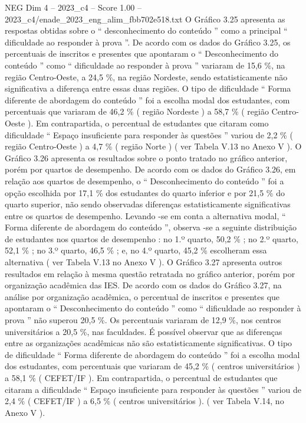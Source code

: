 \begin{textsample}{NEG Dim 4 – 2023\_c4 – Score 1.00 – 2023\_c4/enade\_2023\_eng\_alim\_fbb702e518.txt}
O Gráfico 3.25 apresenta as respostas obtidas sobre o “ desconhecimento do conteúdo ” como a principal “ dificuldade ao responder à prova ”.
De acordo com os dados do Gráfico 3.25, os percentuais de inscritos e presentes que apontaram o “ Desconhecimento do conteúdo ” como “ dificuldade ao responder à prova ” variaram de 15,6 \%, na região Centro-Oeste, a 24,5 \%, na região Nordeste, sendo estatisticamente não significativa a diferença entre essas duas regiões.
O tipo de dificuldade “ Forma diferente de abordagem do conteúdo ” foi a escolha modal dos estudantes, com percentuais que variaram de 46,2 \% ( região Nordeste ) a 58,7 \% ( região Centro-Oeste ).
Em contrapartida, o percentual de estudantes que citaram como dificuldade “ Espaço insuficiente para responder às questões ” variou de 2,2 \% ( região Centro-Oeste ) a 4,7 \% ( região Norte ) ( ver Tabela V.13 no Anexo V ).
O Gráfico 3.26 apresenta os resultados sobre o ponto tratado no gráfico anterior, porém por quartos de desempenho.
De acordo com os dados do Gráfico 3.26, em relação aos quartos de desempenho, o “ Desconhecimento do conteúdo ” foi a opção escolhida por 17,1 \% dos estudantes do quarto inferior e por 21,5 \% do quarto superior, não sendo observadas diferenças estatisticamente significativas entre os quartos de desempenho.
Levando -se em conta a alternativa modal, “ Forma diferente de abordagem do conteúdo ”, observa -se a seguinte distribuição de estudantes nos quartos de desempenho : no 1.º quarto, 50,2 \% ; no 2.º quarto, 52,1 \% ; no 3.º quarto, 46,5 \% ; e, no 4.º quarto, 45,2 \% escolheram essa alternativa ( ver Tabela V.13 no Anexo V ).
O Gráfico 3.27 apresenta outros resultados em relação à mesma questão retratada no gráfico anterior, porém por organização acadêmica das IES.
De acordo com os dados do Gráfico 3.27, na análise por organização acadêmica, o percentual de inscritos e presentes que apontaram o “ Desconhecimento do conteúdo ” como “ dificuldade ao responder à prova ” não superou 20,5 \%.
Os percentuais variaram de 12,9 \%, nos centros universitários a 20,5 \%, nas faculdades.
É possível observar que as diferenças entre as organizações acadêmicas não são estatisticamente significativas.
O tipo de dificuldade “ Forma diferente de abordagem do conteúdo ” foi a escolha modal dos estudantes, com percentuais que variaram de 45,2 \% ( centros universitários ) a 58,1 \% ( CEFET/IF ).
Em contrapartida, o percentual de estudantes que citaram a dificuldade “ Espaço insuficiente para responder às questões ” variou de 2,4 \% ( CEFET/IF ) a 6,5 \% ( centros universitários ). ( ver Tabela V.14, no Anexo V ).

\end{textsample}
